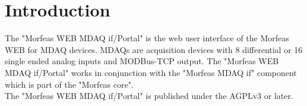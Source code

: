 \section{Introduction}
The "Morfeas WEB MDAQ if/Portal" is the web user interface of the Morfeas WEB for MDAQ devices.
MDAQs are acquisition devices with 8 differential or 16 single ended analog inputs and MODBus-TCP output.
The "Morfeas WEB MDAQ if/Portal" works in conjunction with the "Morfeas MDAQ if" component which is part of the "Morfeas core".\\

\noindent The "Morfeas WEB MDAQ if/Portal" is published under the AGPLv3 or later.